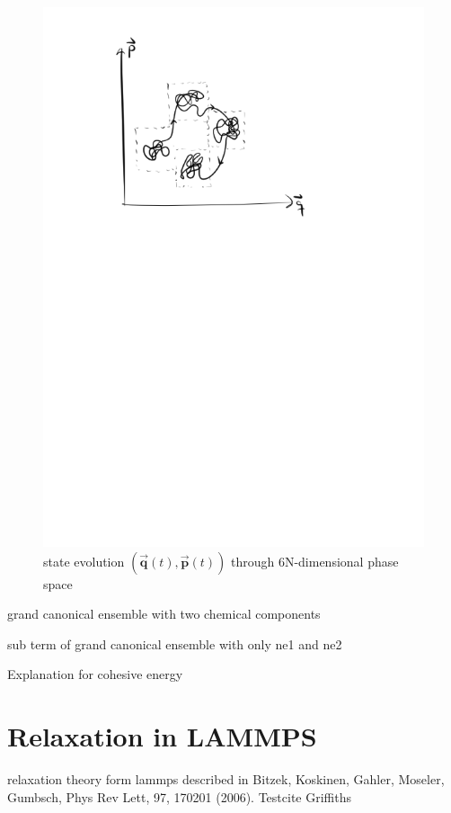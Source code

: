 \begin{figure}
	\centering
	\includegraphics[trim=3cm 18cm 6cm 1.5cm, clip,scale=0.7]{./Inhalt/Bilder/phasespace.png}
	\caption{state evolution $(\vec{\mathbf{q}}(t),\vec{\mathbf{p}}(t))$ through 6N-dimensional phase space}
	\label{fig:phasepsace}
\end{figure}

grand canonical ensemble with two chemical components

sub term of grand canonical ensemble with only ne1 and ne2

Explanation for cohesive energy
\section{Relaxation in LAMMPS}
relaxation theory form lammps 
described in \cite{Bitzek2006} Bitzek, Koskinen, Gahler, Moseler, Gumbsch, Phys Rev Lett, 97, 170201 (2006).
Testcite Griffiths\cite{griffithsQM}
 

